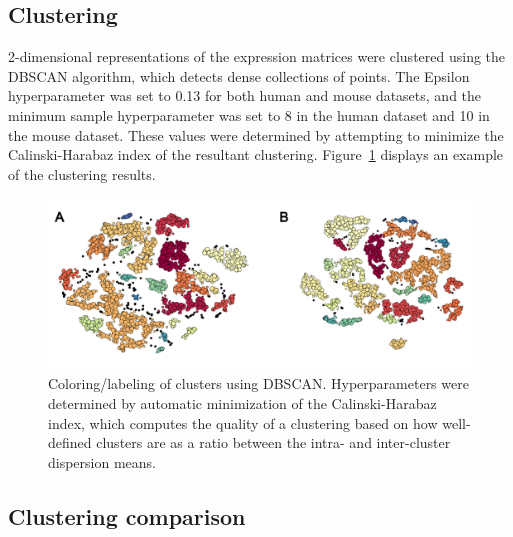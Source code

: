 \documentclass[12pt,oneside,onecolumn,a4paper]{article}
\begin{document}
\subsection{Clustering}

2-dimensional representations of the expression matrices were clustered using the DBSCAN algorithm, which detects dense collections of points. The Epsilon hyperparameter was set to 0.13 for both human and mouse datasets, and the minimum sample hyperparameter was set to 8 in the human dataset and 10 in the mouse dataset. These values were determined by attempting to minimize the Calinski-Harabaz index of the resultant clustering. Figure~\ref{fig:DBSCAN} displays an example of the clustering results.

\begin{figure}[H]
\begin{center}
\includegraphics[width=\columnwidth]{figures/dbscan}
\caption{Coloring/labeling of clusters using DBSCAN. Hyperparameters were determined by automatic minimization of the Calinski-Harabaz index, which computes the quality of a clustering based on how well-defined clusters are as a ratio between the intra- and inter-cluster dispersion means. \label{fig:DBSCAN}%
}
\end{center}
\end{figure}

\subsection{Clustering comparison}
\end{document}
